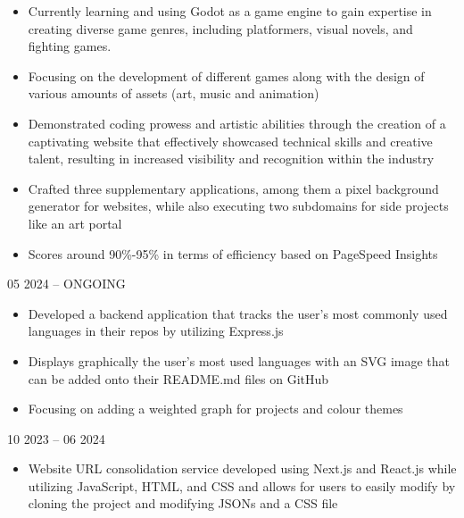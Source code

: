 \documentclass[10pt,a4paper,ragged2e,withhyper,darkmode]{altacv}
\begin{document}
\begin{paracol}{1}
  \begin{itemize}
    \item{Currently learning and using Godot as a game engine to gain expertise in creating diverse game genres, including platformers, visual novels, and fighting games.}
    \item{Focusing on the development of different games along with the design of various amounts of assets (art, music and animation)}
  \end{itemize}
  \begin{itemize}
    \item{Demonstrated coding prowess and artistic abilities through the creation of a captivating website that effectively showcased technical skills and creative talent, resulting in increased visibility and recognition within the industry}
    \item{Crafted three supplementary applications, among them a pixel background generator for websites, while also executing two subdomains for side projects like an art portal}
    \item{Scores around 90\%-95\% in terms of efficiency based on PageSpeed Insights}
  \end{itemize}
  \divider
  {05 2024 -- ONGOING}{}
  \begin{itemize}
    \item{Developed a backend application that tracks the user's most commonly used languages in their repos by utilizing Express.js}
    \item{Displays graphically the user's most used languages with an SVG image that can be added onto their README.md files on GitHub}
    \item{Focusing on adding a weighted graph for projects and colour themes}
  \end{itemize}
  \divider
  {10 2023 -- 06 2024}{}
  \begin{itemize}
    \item{Website URL consolidation service developed using Next.js and React.js while utilizing JavaScript, HTML, and CSS and allows for users to easily modify by cloning the project and modifying JSONs and a CSS file}

\end{itemize}
\end{paracol}
\end{document}
